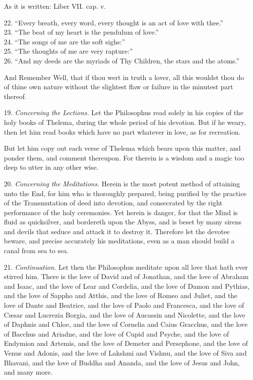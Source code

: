 As it is written: Liber VII. cap. v. \textemdash{}
\begin{quoting}[indentfirst=false]
22. \enquote{Every breath, every word, every thought is an act of love with thee.} \\
23. \enquote{The beat of my heart is the pendulum of love.} \\
24. \enquote{The songs of me are the soft sighs:} \\
25. \enquote{The thoughts of me are very rapture:} \\
26. \enquote{And my deeds are the myriads of Thy Children, the stars and the atoms.}
\end{quoting}

And Remember Well, that if thou wert in truth a lover, all this wouldst thou do of thine own nature without the slightest flaw or failure in the minutest part thereof.

19. \textit{Concerning the Lections.} Let the Philosophus read solely in his copies of the holy books of Thelema, during the whole period of his devotion. But if he weary, then let him read books which have no part whatever in love, as for recreation.

But let him copy out each verse of Thelema which bears upon this matter, and ponder them, and comment thereupon. For therein is a wisdom and a magic too deep to utter in any other wise.

20. \textit{Concerning the Meditations.} Herein is the most potent method of attaining unto the End, for him who is thoroughly prepared, being purified by the practice of the Transmutation of deed into devotion, and consecrated by the right performance of the holy ceremonies. Yet herein is danger, for that the Mind is fluid as quicksilver, and bordereth upon the Abyss, and is beset by many sirens and devils that seduce and attack it to destroy it. Therefore let the devotee beware, and precise accurately his meditations, even as a man should build a canal from sea to sea.

21. \textit{Continuation.} Let then the Philosophus meditate upon all love that hath ever stirred him. There is the love of David and of Jonathan, and the love of Abraham and Isaac, and the love of Lear and Cordelia, and the love of Damon and Pythias, and the love of Sappho and Atthis, and the love of Romeo and Juliet, and the love of Dante and Beatrice, and the love of Paolo and Francesca, and the love of C\ae{}sar and Lucrezia Borgia, and the love of Aucassin and Nicolette, and the love of Daphnis and Chloe, and the love of Cornelia and Caius Gracchus, and the love of Bacchus and Ariadne, and the love of Cupid and Psyche, and the love of Endymion and Artemis, and the love of Demeter and Persephone, and the love of Venus and Adonis, and the love of Lakshmi and Vishnu, and the love of Siva and Bhavani, and the love of Buddha and Ananda, and the love of Jesus and John, and many more.

